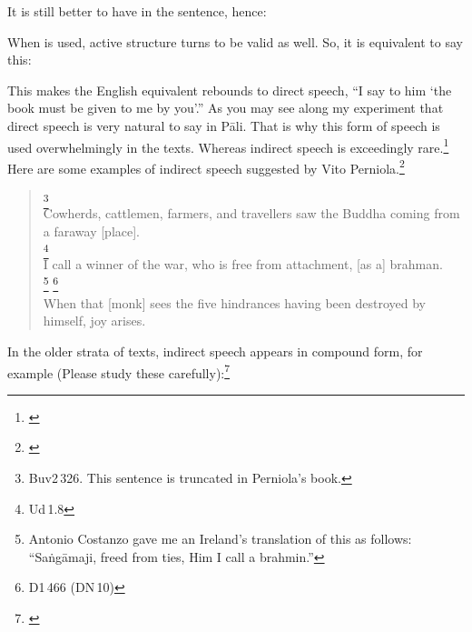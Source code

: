 
It is still better to have  in the sentence, hence:


When  is used, active structure turns to be valid as well. So, it is equivalent to say this:


This makes the English equivalent rebounds to direct speech, ``I say to him `the book must be given to me by you'.'' As you may see along my experiment that direct speech is very natural to say in P\=ali. That is why this form of speech is used overwhelmingly in the texts. Whereas indirect speech is exceedingly rare.\footnote{\citealp[p.~36]{warder:intro}} Here are some examples of indirect speech suggested by Vito Perniola.\footnote{\citealp[p.~395]{perniola:grammar}}

\begin{quote}
\footnote{Buv2\,326. This sentence is truncated in Perniola's book.}\\
Cowherds, cattlemen, farmers, and travellers saw the Buddha coming from a faraway [place].\\[1.5mm]
\footnote{Ud\,1.8}\\
I call a winner of the war, who is free from attachment, [as a] brahman.\\[1.5mm]\footnote{Antonio Costanzo gave me an Ireland's translation of this as follows: ``Sa\.ng\=amaji, freed from ties, Him I call a brahmin.''}
\footnote{D1\,466 (DN\,10)}\\
When that [monk] sees the five hindrances having been destroyed by himself, joy arises.
\end{quote}

In the older strata of texts, indirect speech appears in compound form, for example (Please study these carefully):\footnote{\citealp[pp.~395--6]{perniola:grammar}}

